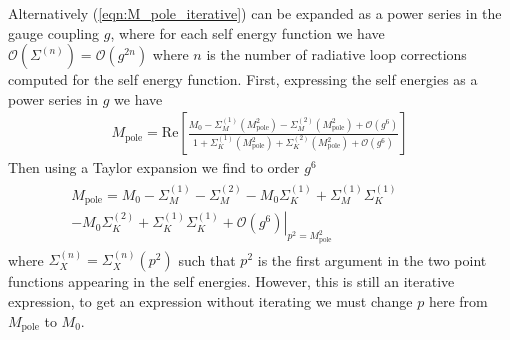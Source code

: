 \documentclass[11pt]{article}
\def\Mp{M_{\text{pole}}}
\begin{document}
Alternatively (\ref{eqn:M_pole_iterative}) can be expanded as a power series in the gauge coupling $g$, where for each self energy function we have $\mathcal{O}(\Sigma^{(n)})=\mathcal{O}(g^{2n})$ where $n$ is the number of radiative loop corrections computed for the self energy function.  First, expressing the self energies as a power series in $g$ we have
\begin{align}
\Mp=\text{Re}\left[\frac{M_0-\Sigma^{(1)}_M(\Mp^2)-\Sigma^{(2)}_M(\Mp^2)+\mathcal{O}(g^6)}{1+\Sigma^{(1)}_K(\Mp^2)+\Sigma^{(2)}_K(\Mp^2)+\mathcal{O}(g^6)}\right] \label{eqn:M_pole_1}
\end{align}
Then using a Taylor expansion we find to order $g^6$
\begin{align*}
\begin{split}
\Mp=M_0-\Sigma^{(1)}_M-\Sigma^{(2)}_M-M_0\Sigma^{(1)}_K+\Sigma^{(1)}_M\Sigma^{(1)}_K\ \ \ \ \ \ \ \ \ \ \  \ \ &\\ \left.-M_0\Sigma^{(2)}_K+\Sigma^{(1)}_K\Sigma^{(1)}_K+\mathcal{O}(g^6)\right|_{p^2=\Mp^2}&
\end{split}
\end{align*}
where $\Sigma^{(n)}_X=\Sigma^{(n)}_X(p^2)$ such that $p^2$ is the first argument in the two point functions appearing in the self energies. However, this is still an iterative expression, to get an expression without iterating we must change $p$ here from $\Mp$ to $M_0$.\\

\end{document}
